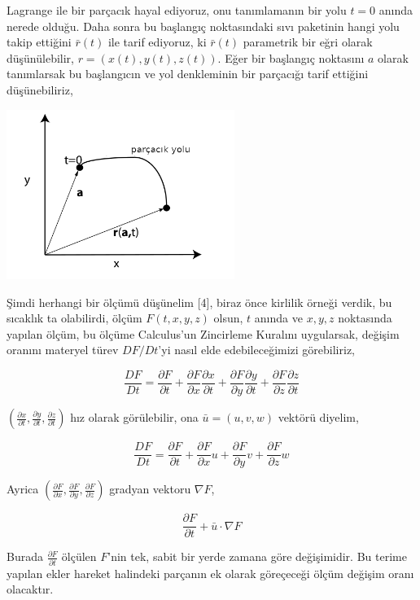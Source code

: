 \documentclass[12pt,fleqn]{article}\usepackage{../../common}
\begin{document}
Lagrange ile bir parçacık hayal ediyoruz, onu tanımlamanın bir yolu $t=0$ anında
nerede olduğu. Daha sonra bu başlangıç noktasındaki sıvı paketinin hangi yolu
takip ettiğini $\bar{r}(t)$ ile tarif ediyoruz, ki $\bar{r}(t)$ parametrik bir
eğri olarak düşünülebilir, $r = ( x(t), y(t), z(t) )$. Eğer bir başlangıç
noktasını $a$ olarak tanımlarsak bu başlangıcın ve yol denkleminin bir parçacığı
tarif ettiğini düşünebiliriz,

\includegraphics[width=20em]{phy_050_fluid_01.png}

Şimdi herhangi bir ölçümü düşünelim [4], biraz önce kirlilik örneği verdik, bu
sıcaklık ta olabilirdi, ölçüm $F(t,x,y,z)$ olsun, $t$ anında ve $x,y,z$
noktasında yapılan ölçüm, bu ölçüme Calculus'un Zincirleme Kuralını uygularsak,
değişim oranını materyel türev $D F / Dt$'yi nasıl elde edebileceğimizi
görebiliriz,

$$
\frac{D F}{D t} =
\frac{\partial F}{\partial t} +
\frac{\partial F}{\partial x} \frac{\partial x}{\partial t} + 
\frac{\partial F}{\partial y} \frac{\partial y}{\partial t} + 
\frac{\partial F}{\partial z} \frac{\partial z}{\partial t} 
$$

$(\frac{\partial x}{\partial t}, \frac{\partial y}{\partial t},\frac{\partial
z}{\partial t})$ hız olarak görülebilir, ona $\bar{u} = (u,v,w)$ vektörü diyelim,

$$
\frac{D F}{D t} =
\frac{\partial F}{\partial t} +
\frac{\partial F}{\partial x} u + 
\frac{\partial F}{\partial y} v + 
\frac{\partial F}{\partial z} w 
$$

Ayrica $(\frac{\partial F}{\partial x},\frac{\partial F}{\partial y},\frac{\partial F}{\partial z})$
gradyan vektoru $\nabla F$,

$$
\frac{\partial F}{\partial t} + \bar{u} \cdot \nabla F
$$

Burada $\frac{\partial F}{\partial t}$ ölçülen $F$'nin tek, sabit bir yerde
zamana göre değişimidir. Bu terime yapılan ekler hareket halindeki parçanın ek
olarak göreçeceği ölçüm değişim oranı olacaktır.
\end{document}

